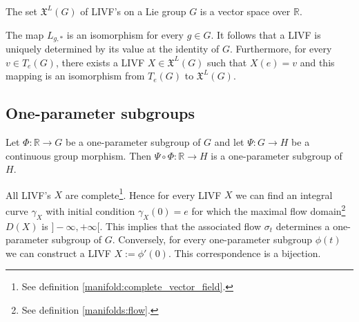     \begin{property}
        The set $\mathfrak{X}^L(G)$ of LIVF's on a Lie group $G$ is a vector space over $\mathbb{R}$.
    \end{property}
    \begin{property}\label{lie:livf_prop}
        The map $L_{g,\ast}$ is an isomorphism for every $g\in G$. It follows that a LIVF is uniquely determined by its value at the identity of $G$. Furthermore, for every $v\in T_e(G)$, there exists a LIVF $X\in\mathfrak{X}^L(G)$ such that $X(e) = v$ and this mapping is an isomorphism from $T_e(G)$ to $\mathfrak{X}^L(G)$.
    \end{property}

\subsection{One-parameter subgroups}


    \begin{property}\label{group:OPS_composition}
        Let $\Phi:\mathbb{R}\rightarrow G$ be a one-parameter subgroup of $G$ and let $\Psi:G\rightarrow H$ be a continuous group morphism. Then $\Psi\circ\Phi:\mathbb{R}\rightarrow H$ is a one-parameter subgroup of $H$.
    \end{property}

    \begin{property}\label{lie:livf_subgroup}
        All LIVF's $X$ are complete\footnote{See definition \ref{manifold:complete_vector_field}.}. Hence for every LIVF $X$ we can find an integral curve $\gamma_X$ with initial condition $\gamma_X(0) = e$ for which the maximal flow domain\footnote{See definition \ref{manifolds:flow}.} $D(X)$ is $]-\infty, +\infty[$. This implies that the associated flow $\sigma_t$ determines a one-parameter subgroup of $G$. Conversely, for every one-parameter subgroup $\phi(t)$ we can construct a LIVF $X := \phi'(0)$. This correspondence is a bijection.
    \end{property}

